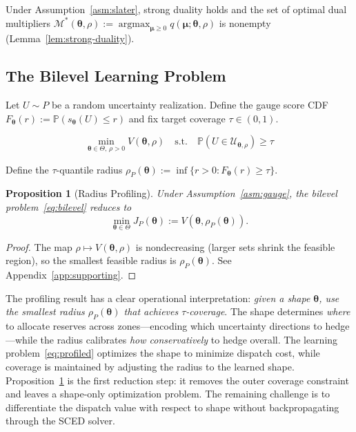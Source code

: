 \documentclass[11pt]{article}
\newcommand{\Prob}{\mathbb{P}}
\newcommand{\cU}{\mathcal{U}}
\newcommand{\cM}{\mathcal{M}}
\newcommand{\btheta}{\bm{\theta}}
\newcommand{\bmu}{\bm{\mu}}
\DeclareMathOperator{\argmax}{argmax}
\newtheorem{proposition}[theorem]{Proposition}
\theoremstyle{definition}
\begin{document}
Under Assumption~\ref{asm:slater}, strong duality holds and the set of optimal dual multipliers $\cM^*(\btheta,\rho):=\argmax_{\bmu\ge 0}q(\bmu;\btheta,\rho)$ is nonempty (Lemma~\ref{lem:strong-duality}).

\subsection{The Bilevel Learning Problem}

Let $U \sim P$ be a random uncertainty realization. Define the gauge score CDF $F_{\btheta}(r) := \Prob(s_{\btheta}(U) \leq r)$ and fix target coverage $\tau \in (0,1)$.

\begin{equation}\label{eq:bilevel}
\boxed{
\min_{\btheta \in \Theta,\, \rho > 0} V(\btheta,\rho) \quad \text{s.t.} \quad \Prob(U \in \cU_{\btheta,\rho}) \geq \tau
}
\end{equation}

Define the $\tau$-quantile radius $\rho_P(\btheta) := \inf\{r > 0 : F_{\btheta}(r) \geq \tau\}$.

\begin{proposition}[Radius Profiling]\label{prop:profiling}
Under Assumption~\ref{asm:gauge}, the bilevel problem~\eqref{eq:bilevel} reduces to
\begin{equation}\label{eq:profiled}
\min_{\btheta \in \Theta} J_P(\btheta) := V(\btheta, \rho_P(\btheta)).
\end{equation}
\end{proposition}

\begin{proof}
The map $\rho \mapsto V(\btheta, \rho)$ is nondecreasing (larger sets shrink the feasible region), so the smallest feasible radius is $\rho_P(\btheta)$. See Appendix~\ref{app:supporting}.
\end{proof}

The profiling result has a clear operational interpretation: \emph{given a shape $\btheta$, use the smallest radius $\rho_P(\btheta)$ that achieves $\tau$-coverage}. The shape determines \emph{where} to allocate reserves across zones---encoding which uncertainty directions to hedge---while the radius calibrates \emph{how conservatively} to hedge overall. The learning problem~\eqref{eq:profiled} optimizes the shape to minimize dispatch cost, while coverage is maintained by adjusting the radius to the learned shape. Proposition~\ref{prop:profiling} is the first reduction step: it removes the outer coverage constraint and leaves a shape-only optimization problem. The remaining challenge is to differentiate the dispatch value with respect to shape without backpropagating through the SCED solver.
\end{document}
